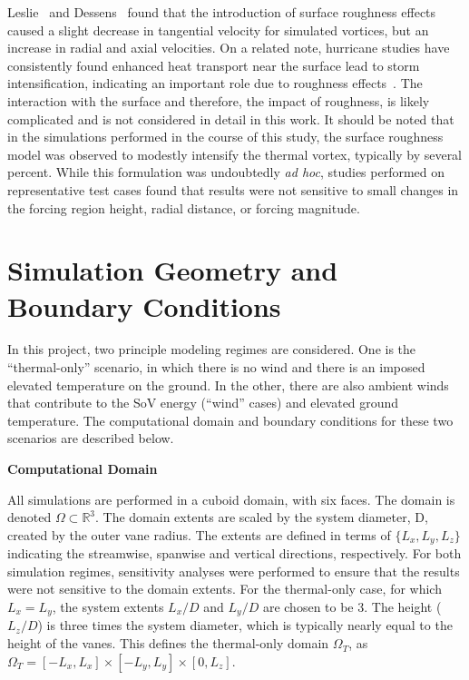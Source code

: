 Leslie~\cite{leslie1977surface} and Dessens~\cite{dessens1972influence}
found that the introduction of surface roughness effects caused a slight
decrease in tangential velocity for simulated vortices, but an increase
in radial and axial velocities. 
On a related note, hurricane studies have
consistently found enhanced heat transport near the surface lead
to storm intensification, indicating an important role due to roughness
effects~\cite{Zeng2010,GRL:GRL50047,hurricane_drag}. The interaction
with the surface and therefore, the impact of roughness, is likely
complicated and is not considered in detail in this work. It should be 
noted that in the simulations performed in the course of this study, the
surface roughness model was observed to modestly intensify the thermal
vortex, typically by several percent. While this formulation was
undoubtedly {\it ad hoc}, studies performed on representative test 
cases found that results were not sensitive to small
changes in the forcing region height, radial distance, or
forcing magnitude. 


\section{Simulation Geometry and Boundary Conditions}
\label{sec:bc}

In this project, two principle modeling regimes are considered.  
One is the ``thermal-only'' scenario, in which there is no wind
 and there is an imposed elevated temperature on the ground.  
In the other, there are also ambient winds that contribute to the SoV energy
(``wind'' cases) and elevated ground temperature. 
The computational domain and boundary conditions for these 
two scenarios are described below.

\textbf{Computational Domain} 

All simulations are performed in a cuboid domain, with six
faces.  The domain is denoted $\Omega \subset \mathbb{R}^3$. 
The domain extents are scaled by the system diameter, D, created by the
outer vane radius. The extents are defined in terms of $\{L_x,L_y,L_z\}$ indicating the 
streamwise, spanwise and vertical directions, respectively. 
For both simulation regimes, sensitivity analyses 
were performed to ensure that the results were not sensitive 
to the domain extents. For the thermal-only case, for which $L_x = L_y$,
the system 
extents $L_x/D$ and $L_y/D$ are chosen to be 3. The height ($L_z/D$) is
three times the system diameter, which is typically nearly equal to the
height of the vanes. This defines the thermal-only domain $\Omega_T$, 
as $\Omega_T = \left[-L_x,L_x \right] \times \left[-L_y,L_y \right]
\times \left[0,L_z \right]$.   

